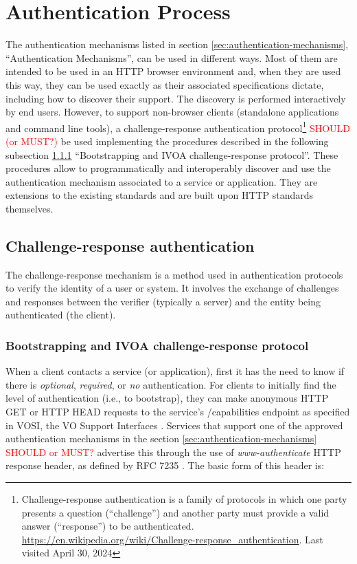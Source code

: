 \documentclass[11pt,a4paper]{ivoa}
\begin{document}
\section{Authentication Process}
\label{sec:auth_discovery}

The authentication mechanisms listed in section
\ref{sec:authentication-mechanisms}, ``Authentication Mechanisms'',
can be used in different ways. Most of them are intended to
be used in an HTTP browser environment and, when they are used this
way, they can be used exactly as their associated specifications
dictate, including how to discover their support. The discovery is
performed interactively by end users.
However, to support non-browser clients
(standalone applications and command line tools), a challenge-response
authentication protocol\footnote{Challenge-response authentication is
a family of protocols in which one party presents a question
(``challenge'') and another party must provide a valid answer
(``response'') to be authenticated.
\url{https://en.wikipedia.org/wiki/Challenge-response_authentication}.
Last visited April 30, 2024} \textcolor{red}{SHOULD
(or MUST?)} be used implementing the procedures described in
the following subsection \ref{sec:bootstrapping-challenge}
``Bootstrapping and IVOA challenge-response protocol''. These procedures
allow to programmatically and interoperably discover and use the
authentication mechanism associated to a service or application. They
are extensions to the existing standards and are built upon HTTP
standards themselves.

\subsection{Challenge-response authentication}
\label{challenge-response-auth}
The challenge-response mechanism is a method used in authentication
protocols to verify the identity of a user or system. It involves the
exchange of challenges and responses between the verifier (typically a
server) and the entity being authenticated (the client).

\subsubsection{Bootstrapping and IVOA challenge-response protocol}
\label{sec:bootstrapping-challenge}
When a client contacts a service (or application), first it has the need
to know if there is \emph{optional}, \emph{required}, or \emph{no}
authentication.
For clients to initially find the level of authentication (i.e., to
bootstrap), they can make anonymous HTTP GET or HTTP HEAD requests to
the service's /capabilities endpoint as specified in VOSI, the
VO Support Interfaces \citep{2017ivoa.spec.0524G}.
Services that support one of the approved authentication mechanisms in the section
\ref{sec:authentication-mechanisms} \textcolor{red}{SHOULD or MUST?}
advertise this through the use of \emph{www-authenticate} HTTP response
header, as defined by RFC 7235 \citep{std:RFC7235}. The basic form of this
header is:
\end{document}
